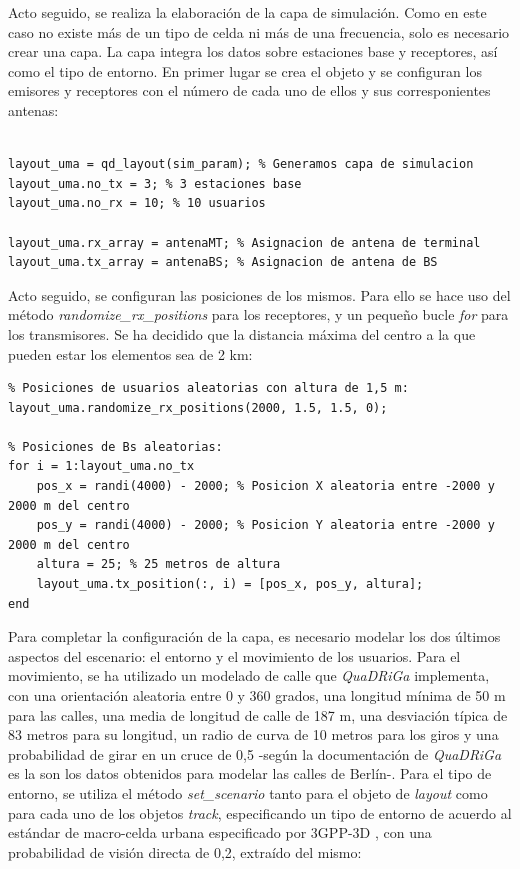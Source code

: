 Acto seguido, se realiza la elaboración de la capa de simulación. Como en este caso no existe más de un tipo de celda ni más de una frecuencia, solo es necesario crear una capa. La capa integra los datos sobre estaciones base y receptores, así como el tipo de entorno. En primer lugar se crea el objeto y se configuran los emisores y receptores con el número de cada uno de ellos y sus corresponientes antenas:

\begin{lstlisting}[style=Matlab-editor, basicstyle=\tiny]
%% Transmisores y receptores

layout_uma = qd_layout(sim_param); % Generamos capa de simulacion
layout_uma.no_tx = 3; % 3 estaciones base
layout_uma.no_rx = 10; % 10 usuarios

layout_uma.rx_array = antenaMT; % Asignacion de antena de terminal
layout_uma.tx_array = antenaBS; % Asignacion de antena de BS
\end{lstlisting}

Acto seguido, se configuran las posiciones de los mismos. Para ello se hace uso del método \textit{randomize\_rx\_positions} para los receptores, y un pequeño bucle \textit{for} para los transmisores. Se ha decidido que la distancia máxima del centro a la que pueden estar los elementos sea de 2 km:

\begin{lstlisting}[style=Matlab-editor, basicstyle=\tiny]
%% Posiciones
% Posiciones de usuarios aleatorias con altura de 1,5 m:
layout_uma.randomize_rx_positions(2000, 1.5, 1.5, 0); 

% Posiciones de Bs aleatorias:
for i = 1:layout_uma.no_tx
    pos_x = randi(4000) - 2000; % Posicion X aleatoria entre -2000 y 2000 m del centro
    pos_y = randi(4000) - 2000; % Posicion Y aleatoria entre -2000 y 2000 m del centro
    altura = 25; % 25 metros de altura
    layout_uma.tx_position(:, i) = [pos_x, pos_y, altura];
end
\end{lstlisting}

Para completar la configuración de la capa, es necesario modelar los dos últimos aspectos del escenario: el entorno y el movimiento de los usuarios. Para el movimiento, se ha utilizado un modelado de calle que \textit{QuaDRiGa} implementa, con una orientación aleatoria entre 0 y 360 grados, una longitud mínima de 50 m para las calles, una media de longitud de calle de 187 m, una desviación típica de 83 metros para su longitud, un radio de curva de 10 metros para los giros y una probabilidad de girar en un cruce de 0,5 -según la documentación de \textit{QuaDRiGa} es la son los datos obtenidos para modelar las calles de Berlín-. Para el tipo de entorno, se utiliza el método \textit{set\_scenario} tanto para el objeto de \textit{layout} como para cada uno de los objetos \textit{track}, especificando un tipo de entorno de acuerdo al estándar de macro-celda urbana especificado por 3GPP-3D \cite{3gpp3d}, con una probabilidad de visión directa de 0,2, extraído del mismo:


